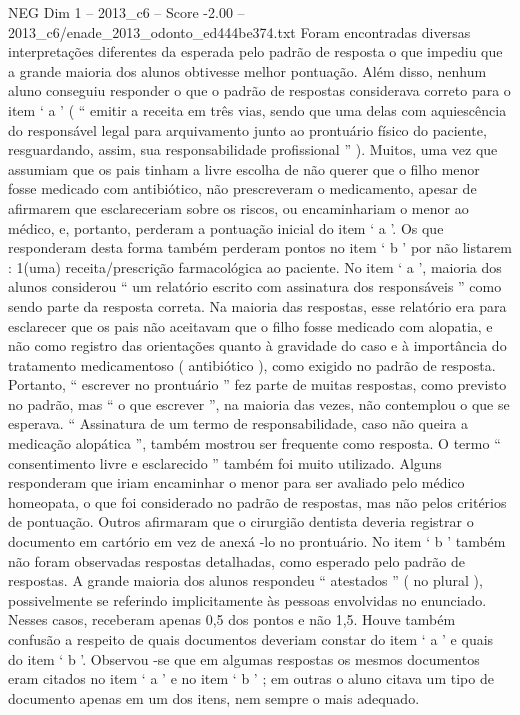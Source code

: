 \begin{textsample}{NEG Dim 1 – 2013\_c6 – Score -2.00 – 2013\_c6/enade\_2013\_odonto\_ed444be374.txt}
Foram encontradas diversas interpretações diferentes da esperada pelo padrão de resposta o que impediu que a grande maioria dos alunos obtivesse melhor pontuação.
Além disso, nenhum aluno conseguiu responder o que o padrão de respostas considerava correto para o item ‘ a ’ ( “ emitir a receita em três vias, sendo que uma delas com aquiescência do responsável legal para arquivamento junto ao prontuário físico do paciente, resguardando, assim, sua responsabilidade profissional ” ).
Muitos, uma vez que assumiam que os pais tinham a livre escolha de não querer que o filho menor fosse medicado com antibiótico, não prescreveram o medicamento, apesar de afirmarem que esclareceriam sobre os riscos, ou encaminhariam o menor ao médico, e, portanto, perderam a pontuação inicial do item ‘ a ’.
Os que responderam desta forma também perderam pontos no item ‘ b ’ por não listarem : 1(uma) receita/prescrição farmacológica ao paciente.
No item ‘ a ’, maioria dos alunos considerou “ um relatório escrito com assinatura dos responsáveis ” como sendo parte da resposta correta.
Na maioria das respostas, esse relatório era para esclarecer que os pais não aceitavam que o filho fosse medicado com alopatia, e não como registro das orientações quanto à gravidade do caso e à importância do tratamento medicamentoso ( antibiótico ), como exigido no padrão de resposta.
Portanto, “ escrever no prontuário ” fez parte de muitas respostas, como previsto no padrão, mas “ o que escrever ”, na maioria das vezes, não contemplou o que se esperava. “ Assinatura de um termo de responsabilidade, caso não queira a medicação alopática ”, também mostrou ser frequente como resposta.
O termo “ consentimento livre e esclarecido ” também foi muito utilizado.
Alguns responderam que iriam encaminhar o menor para ser avaliado pelo médico homeopata, o que foi considerado no padrão de respostas, mas não pelos critérios de pontuação.
Outros afirmaram que o cirurgião dentista deveria registrar o documento em cartório em vez de anexá -lo no prontuário.
No item ‘ b ’ também não foram observadas respostas detalhadas, como esperado pelo padrão de respostas.
A grande maioria dos alunos respondeu “ atestados ” ( no plural ), possivelmente se referindo implicitamente às pessoas envolvidas no enunciado.
Nesses casos, receberam apenas 0,5 dos pontos e não 1,5.
Houve também confusão a respeito de quais documentos deveriam constar do item ‘ a ’ e quais do item ‘ b ’.
Observou -se que em algumas respostas os mesmos documentos eram citados no item ‘ a ’ e no item ‘ b ’ ; em outras o aluno citava um tipo de documento apenas em um dos itens, nem sempre o mais adequado.

\end{textsample}
